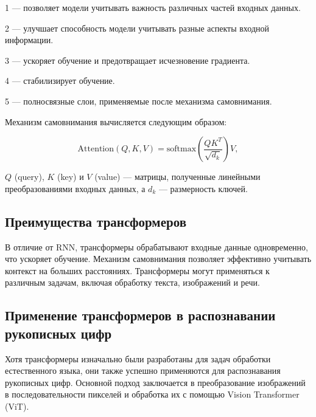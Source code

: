   1  — позволяет модели учитывать 
важность различных частей входных данных.

  2  — улучшает 
способность модели учитывать разные аспекты входной информации.

  3  — ускоряет обучение и 
предотвращает исчезновение градиента.

  4  — стабилизирует 
обучение.

  5  — полносвязные слои, применяемые после механизма 
самовнимания.

Механизм самовнимания вычисляется следующим образом:

\begin{equation}
    \text{Attention}(Q, K, V) = \text{softmax}\left(\frac{QK^T}{\sqrt{d_k}}\right) V,
\end{equation}

 $Q$ (query), $K$ (key) и $V$ (value) — матрицы, полученные линейными 
преобразованиями входных данных, а $d_k$ — размерность ключей.

\subsection{Преимущества трансформеров}
\hspace*{12.5 mm}В отличие от RNN, трансформеры обрабатывают входные данные 
одновременно, что ускоряет обучение. Механизм самовнимания позволяет эффективно 
учитывать контекст на больших расстояниях. Трансформеры могут применяться к 
различным задачам, включая обработку текста, изображений и речи.

\subsection{Применение трансформеров в распознавании рукописных цифр}
\hspace*{12.5 mm}Хотя трансформеры изначально были разработаны для задач 
обработки естественного языка, они также успешно применяются для распознавания 
рукописных цифр. Основной подход заключается в преобразование изображений в 
последовательности пикселей и обработка их с помощью Vision Transformer (ViT).

